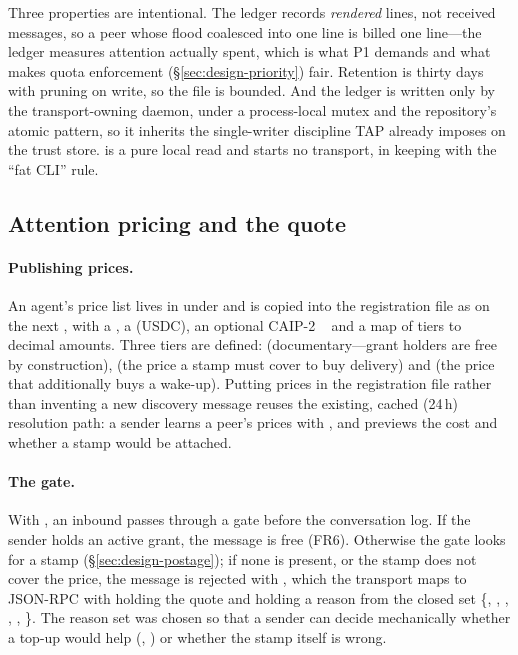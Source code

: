 Three properties are intentional. The ledger records \emph{rendered} lines, not received
messages, so a peer whose flood coalesced into one line is billed one line---the ledger
measures attention actually spent, which is what P1 demands and what makes quota
enforcement (\S\ref{sec:design-priority}) fair. Retention is thirty days with pruning on
write, so the file is bounded. And the ledger is written only by the transport-owning
daemon, under a process-local mutex and the repository's atomic 
pattern, so it inherits the single-writer discipline TAP already imposes on the trust
store.  is a pure local read and starts no transport, in keeping
with the ``fat CLI'' rule.

\subsection{Attention pricing and the  quote}
\label{sec:design-pricing}

\paragraph{Publishing prices.}
An agent's price list lives in  under  and is
copied into the registration file as  on the next
, with a , a  (USDC), an optional
CAIP-2 ~\cite{caip2} and a map of tiers to decimal amounts. Three tiers are defined:
 (documentary---grant holders are free by construction),
 (the price a stamp must cover to buy delivery) and  (the
price that additionally buys a wake-up). Putting prices in the registration file rather
than inventing a new discovery message reuses the existing, cached
(\raisebox{0.3ex}{\textasciitilde}24\,h) resolution path: a sender learns a peer's prices
with , and  previews the cost
and whether a stamp would be attached.

\paragraph{The gate.}
With , an inbound  passes through a gate
before the conversation log. If the sender holds an active  grant,
the message is free (FR6). Otherwise the gate looks for a stamp
(\S\ref{sec:design-postage}); if none is present, or the stamp does not cover the
 price, the message is rejected with
, which the transport maps to JSON-RPC
 with  holding the quote and
 holding a reason from the closed set
\{, , ,
, , \}. The reason set
was chosen so that a sender can decide mechanically whether a top-up would help
(, ) or whether the stamp itself is wrong.

